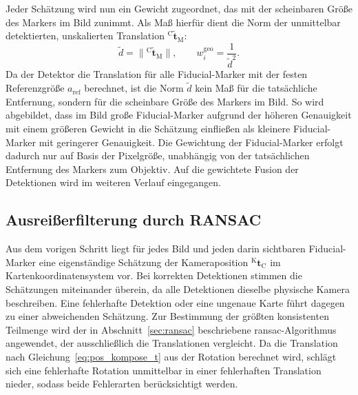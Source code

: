 Jeder Schätzung wird nun ein Gewicht zugeordnet, das mit der scheinbaren Größe des Markers im Bild zunimmt.
Als Maß hierfür dient die Norm der unmittelbar detektierten, unskalierten Translation $^{\mathrm{C}}\tilde{\mathbf{t}}_{\mathrm{M}}$:
\begin{equation}
\tilde{d} = \lVert{^{\mathrm{C}}\tilde{\mathbf{t}}_{\mathrm{M}}}\rVert, \qquad w_i^{\mathrm{geo}} = \frac{1}{\tilde{d}^{2}}.
\label{eq:pos_gewicht}
\end{equation}
Da der Detektor die Translation für alle Fiducial-Marker mit der festen Referenzgröße $a_{\mathrm{ref}}$ berechnet, 
ist die Norm $\tilde{d}$ kein Maß für die tatsächliche Entfernung, sondern für die scheinbare Größe des Markers im Bild.
So wird abgebildet, dass im Bild große Fiducial-Marker aufgrund der höheren Genauigkeit mit einem größeren Gewicht in die Schätzung einfließen 
als kleinere Fiducial-Marker mit geringerer Genauigkeit.
Die Gewichtung der Fiducial-Marker erfolgt dadurch nur auf Basis der Pixelgröße, unabhängig von der tatsächlichen Entfernung des Markers zum Objektiv.
Auf die gewichtete Fusion der Detektionen wird im weiteren Verlauf eingegangen.



\subsection*{Ausreißerfilterung durch RANSAC}
\label{subsec:pos_ausreisserfilterung}
Aus dem vorigen Schritt liegt für jedes Bild und jeden darin sichtbaren Fiducial-Marker eine eigenständige Schätzung
der Kameraposition $^{\mathrm{K}}\mathbf{t}_{\mathrm{C}}$ im Kartenkoordinatensystem vor.
Bei korrekten Detektionen stimmen die Schätzungen miteinander überein, da alle Detektionen dieselbe physische Kamera beschreiben.
Eine fehlerhafte Detektion oder eine ungenaue Karte führt dagegen zu einer abweichenden Schätzung.
Zur Bestimmung der größten konsistenten Teilmenge wird der in Abschnitt~\ref{sec:ransac} beschriebene \gls{ransac}-Algorithmus angewendet,
der ausschließlich die Translationen vergleicht.
Da die Translation nach Gleichung~\ref{eq:pos_kompose_t} aus der Rotation berechnet wird, schlägt sich eine fehlerhafte Rotation
unmittelbar in einer fehlerhaften Translation nieder, sodass beide Fehlerarten berücksichtigt werden.

